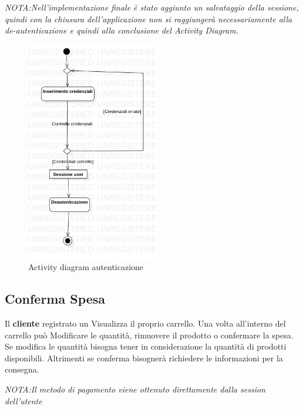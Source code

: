 \documentclass[12pt, a4paper]{report}
\begin{document}
\emph{NOTA:\@ Nell'implementazione finale è stato aggiunto un salvataggio della sessione, quindi con la chiusura dell'applicazione non si raggiungerà necessariamente alla de-autenticazione e quindi alla conclusione del Activity Diagram}.

\begin{figure}[h]
  \centering
  \includegraphics[width=0.52\textwidth]{Use Case Model!Autenticazione!ActivityAutenticazione!ActivityDiagramAutenticazione_8.png}
  \caption{Activity diagram autenticazione}
\end{figure}

\newpage

\subsection{Conferma Spesa}

Il \textbf{cliente} registrato un Visualizza il proprio carrello. 
Una volta all'interno del carrello può Modificare le quantità, rimuovere il prodotto o confermare la spesa. 
Se modifica le quantità bisogna tener in considerazione la quantità di prodotti disponibili. 
Altrimenti se conferma bisognerà richiedere le informazioni per la consegna.

\emph{NOTA:\@ Il metodo di pagamento viene ottenuto direttamente dalla session dell'utente}
\end{document}
